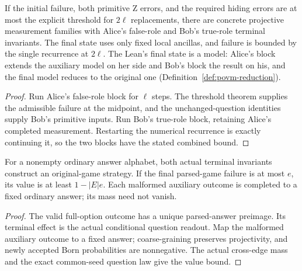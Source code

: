 \begin{lemma}
\label{lem:intro-two-sided-iteration}
\leanok
If the initial failure, both primitive Z errors, and the required hiding
errors are at most the explicit threshold for $2\ell$ replacements, there
are concrete projective measurement families with Alice's false-role and
Bob's true-role terminal invariants. The final state uses only fixed local
ancillas, and failure is bounded by the single recurrence at $2\ell$.
The Lean's final state is a model: Alice's block extends the auxiliary model on her side and Bob's
block the result on his, and the final model reduces to the original one
(Definition~\ref{def:povm-reduction}).
\end{lemma}
\begin{proof}
\leanok
Run Alice's false-role block for $\ell$ steps. The threshold theorem supplies
the admissible failure at the midpoint, and the unchanged-question identities
supply Bob's primitive inputs. Run Bob's true-role block, retaining Alice's
completed measurement. Restarting the numerical recurrence is exactly
continuing it, so the two blocks have the stated combined bound.
\end{proof}

\begin{lemma}
\label{lem:intro-terminal-option-extraction}
\leanok
For a nonempty ordinary answer alphabet, both actual terminal invariants
construct an original-game strategy. If the final parsed-game failure is
at most $e$, its value is at least $1-|E|e$. Each malformed auxiliary outcome
is completed to a fixed ordinary answer; its mass need not vanish.
\end{lemma}
\begin{proof}
\leanok
The valid full-option outcome has a unique parsed-answer preimage. Its
terminal effect is the actual conditional question readout. Map the malformed
auxiliary outcome to a fixed answer; coarse-graining preserves projectivity,
and newly accepted Born probabilities are nonnegative. The actual cross-edge
mass and the exact common-seed question law give the value bound.
\end{proof}


